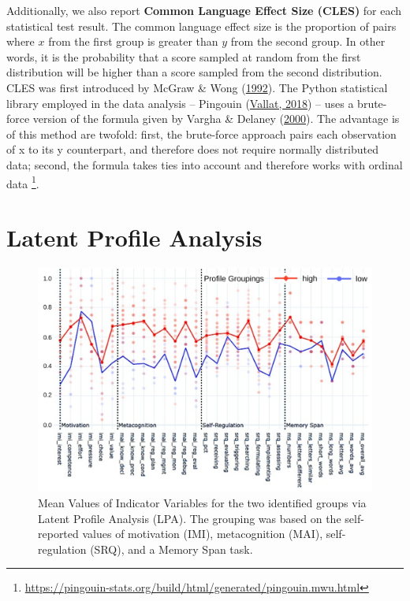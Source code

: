 \documentclass[letterpaper, nobind]{templates/ociamthesis}
\begin{document}
Additionally, we also report \textbf{Common Language Effect Size (CLES)} for each statistical test result.
The common language effect size is the proportion of pairs where \(x\) from the first group is greater than \(y\) from the second group.
In other words, it is the probability that a score sampled at random from the first distribution will be higher than a score sampled from the second distribution.
CLES was first introduced by McGraw \& Wong (\protect\hyperlink{ref-mcgraw1992common}{1992}).
The Python statistical library employed in the data analysis -- Pingouin (\protect\hyperlink{ref-vallat2018pingouin}{Vallat, 2018}) -- uses a brute-force version of the formula given by Vargha \& Delaney (\protect\hyperlink{ref-vargha2000critique}{2000}).
The advantage is of this method are twofold:
first, the brute-force approach pairs each observation of x to its y counterpart, and therefore does not require normally distributed data;
second, the formula takes ties into account and therefore works with ordinal data \footnote{\url{https://pingouin-stats.org/build/html/generated/pingouin.mwu.html}}.

\hypertarget{sec-res-phase2-lpa}{%
\section{Latent Profile Analysis}\label{sec-res-phase2-lpa}}

\begin{figure}

{\centering \includegraphics[width=1\linewidth]{figs/lpa-profile-means} 

}

\caption[Groups identified by Latent Profile Analysis.]{Mean Values of Indicator Variables for the two identified groups via Latent Profile Analysis (LPA). The grouping was based on the self-reported values of motivation (IMI), metacognition (MAI), self-regulation (SRQ), and a Memory Span task.}\label{fig:lpa-profile-means}
\end{figure}
\end{document}
